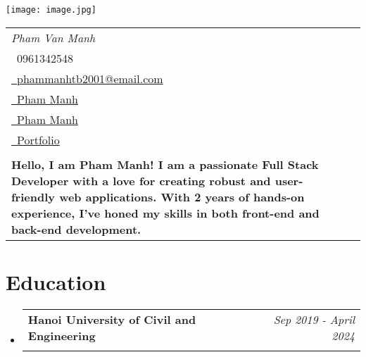 \documentclass[a4paper,11pt]{article}
\makeatletter
\newcommand{\resumeSubheading}[4]{
\vspace{0.5mm}\item
    \begin{tabular*}{0.98\textwidth}[t]{l@{\extracolsep{\fill}}r}
        \textbf{#1} & \textit{\footnotesize{#4}} \\
        \textit{\footnotesize{#3}} &  \footnotesize{#2}\\
    \end{tabular*}
    \vspace{-2.4mm}
}
\newcommand{\resumeSubHeadingListStart}{\begin{itemize}[leftmargin=*,labelsep=0mm]}
\newcommand{\resumeSubHeadingListEnd}{\end{itemize}\vspace{2mm}}
\newcommand{\name}{Pham Van Manh} %
\newcommand{\phone}{0961342548} %
\newcommand{\emaila}{phammanhtb2001@email.com} %
\newcommand{\accountName}{Pham Manh} %
\newcommand{\headline}{Hello, I am Pham Manh! I am a passionate Full Stack Developer with a love for creating robust and user-friendly web applications. With 2 years of hands-on experience, I’ve honed my skills in both front-end and back-end development.}
\makeatother
\begin{document}
\selectfont


\parbox{2.6cm}{%
\texttt{[image: image.jpg]}
}
\parbox{\dimexpr\linewidth-2.9cm\relax}{
\begin{tabularx}{\linewidth}{L r} \\
  \textit{\Large \name} \\ {\raisebox{0.0\height}{\footnotesize \faPhone}\ \phone}\\
\href{mailto:\emaila}{\raisebox{0.0\height}{\footnotesize \faEnvelope}\ {\emaila}} \\
 \href{https://github.com/manhpvxj}{\raisebox{0.0\height}{\footnotesize \faGithub}\ {\accountName}} \\
  \href{https://www.linkedin.com/in/manhpvxj/}{\raisebox{0.0\height}{\footnotesize \faLinkedin}\ {\accountName}} \\
  \href{https:/manhtheweeb.id.vn}{\raisebox{0.0\height}{\footnotesize \faLink}\ {Portfolio}} \\ \\
  \textbf{\headline}
\end{tabularx}
}





\section{\textbf{Education}}
  \resumeSubHeadingListStart
    \resumeSubheading
      {Hanoi University of Civil and Engineering}{}
      {}{Sep 2019 - April 2024}
  \resumeSubHeadingListEnd
%



\end{document}
